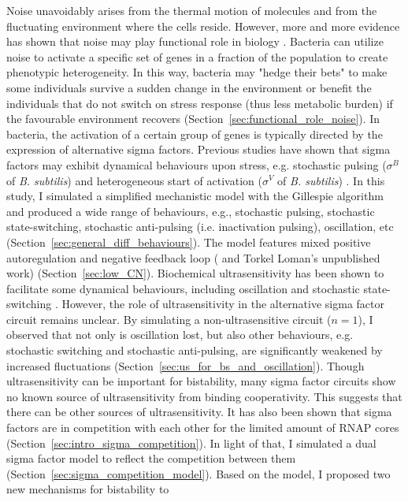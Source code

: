 Noise unavoidably arises from the thermal motion of molecules and
from the fluctuating environment where the cells reside.
However, more and more evidence has shown that noise may play functional
role in biology \cite{raj08,eldar10a}.
Bacteria can utilize noise to activate a specific set of genes
in a fraction of the population to create phenotypic 
heterogeneity.
In this way, bacteria may "hedge their bets" to make some individuals
survive a sudden change in the environment or benefit the individuals
that do not switch on stress response (thus less metabolic burden)
if the favourable environment recovers
(Section~\ref{sec:functional_role_noise}).
In bacteria, the activation of a certain group of genes is typically directed
by the expression of alternative sigma factors.
Previous studies have shown that sigma factors may exhibit dynamical
behaviours upon stress, e.g. stochastic pulsing ($\sigma^B$ of
\textit{B. subtilis}) and heterogeneous start of activation
($\sigma^V$ of \textit{B. subtilis}) \cite{locke11,schwall21a}.
In this study, I simulated a simplified mechanistic model 
with the Gillespie algorithm and produced
a wide range of behaviours, e.g., stochastic pulsing, stochastic
state-switching, stochastic anti-pulsing (i.e. inactivation pulsing),
oscillation, etc (Section~\ref{sec:general_diff_behaviours}).
The model features mixed positive autoregulation and negative 
feedback loop (\cite{schwall21a} and Torkel Loman's unpublished work)
(Section~\ref{sec:low_CN}).
Biochemical ultrasensitivity has been shown to facilitate some
dynamical behaviours, including oscillation and stochastic state-switching
\cite{ferrell14c}.
However, the role of ultrasensitivity in the alternative sigma factor 
circuit remains unclear.
By simulating a non-ultrasensitive circuit ($n = 1$), I observed that
not only is oscillation lost, but also other behaviours, 
e.g. stochastic switching and stochastic anti-pulsing, are significantly
weakened by increased fluctuations
(Section~\ref{sec:us_for_bs_and_oscillation}).
Though ultrasensitivity can be important for bistability,
many sigma factor circuits show no known source of ultrasensitivity
from binding cooperativity.
This suggests that there can be other sources of ultrasensitivity.
It has also been shown that sigma factors are in competition with each
other for the limited amount of RNAP cores 
(Section~\ref{sec:intro_sigma_competition}).
In light of that, I simulated a dual sigma factor model to reflect
the competition between them (Section~\ref{sec:sigma_competition_model}).
Based on the model, I proposed two new mechanisms for bistability to
